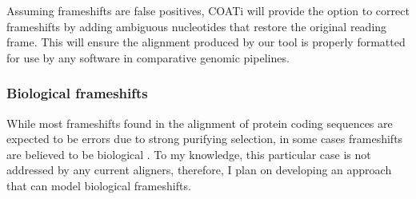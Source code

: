 
Assuming frameshifts are false positives, COATi will provide the option to
correct frameshifts by adding ambiguous nucleotides that restore the original
reading frame.
This will ensure the alignment produced by our tool is properly formatted for
use by any software in comparative genomic pipelines.

\subsubsection{Biological frameshifts}

While most frameshifts found in the alignment of protein coding sequences are
expected to be errors due to strong purifying selection, in some cases
frameshifts are believed to be biological \parencite{hu2012predicting}.
To my knowledge, this particular case is not addressed by any current aligners,
therefore, I plan on developing an approach that can model biological
frameshifts.

